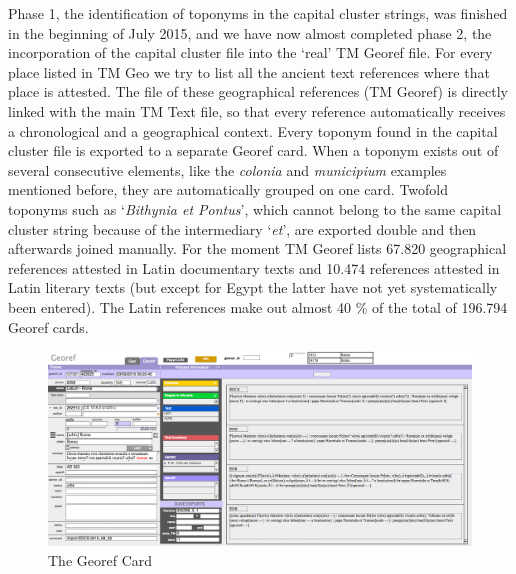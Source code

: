 \documentclass[amsthm,ebook]{saparticle}
\begin{document}
Phase 1, the identification of toponyms in the capital cluster strings, was finished in the beginning of July 2015,
and we have now almost completed phase 2, the incorporation of the capital cluster file into the `real' TM Georef file. For
every place listed in TM Geo we try to list all the ancient text references where that place is attested. The file of
these geographical references (TM Georef) is directly linked with the main TM Text file, so that every reference
automatically receives a chronological and a geographical context. Every toponym found in the capital cluster file is
exported to a separate Georef card. When a toponym exists out of several consecutive elements, like the \emph{colonia} and
\emph{municipium} examples mentioned before, they are automatically grouped on one card. Twofold toponyms such as `\emph{Bithynia et
Pontus}', which cannot belong to the same capital cluster string because of the intermediary `\emph{et}', are exported double
and then afterwards joined manually. For the moment TM Georef lists 67.820 geographical references attested in Latin
documentary texts and 10.474 references attested in Latin literary texts (but except for Egypt the latter have not yet
systematically been entered). The Latin references make out almost 40 \% of the total of 196.794 Georef cards.




\begin{figure}[!hbp]
\centering
 \includegraphics[width=\columnwidth]{EAGLE2016FullPaperVerreth-img002.png}
\caption{The Georef Card}
\label{fig:2}
\end{figure}
\end{document}
